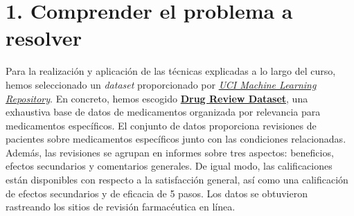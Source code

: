 \documentclass[spanish,]{article}
\begin{document}

\vspace{0.15cm}


\vspace{0.15cm}


\vspace{0.15cm}

\newpage

\thispagestyle{empty}
\tableofcontents
\newpage

\thispagestyle{empty}
\listoffigures
\newpage

\thispagestyle{empty}
\listoftables
\newpage

\pagestyle{fancy}
\fancyhf{}
\rhead{\thepage}
\setcounter{page}{1}

\hypertarget{comprender-el-problema-a-resolver}{%
\section{1. Comprender el problema a
resolver}\label{comprender-el-problema-a-resolver}}

Para la realización y aplicación de las técnicas explicadas a lo largo
del curso, hemos seleccionado un \emph{dataset} proporcionado por
\href{https://archive.ics.uci.edu/ml/index.php}{\emph{UCI Machine
Learning Repository}}. En concreto, hemos escogido
\href{https://archive.ics.uci.edu/ml/datasets/Drug+Review+Dataset+\%28Druglib.com\%29}{\textbf{Drug
Review Dataset}}, una exhaustiva base de datos de medicamentos
organizada por relevancia para medicamentos específicos. El conjunto de
datos proporciona revisiones de pacientes sobre medicamentos específicos
junto con las condiciones relacionadas. Además, las revisiones se
agrupan en informes sobre tres aspectos: beneficios, efectos secundarios
y comentarios generales. De igual modo, las calificaciones están
disponibles con respecto a la satisfacción general, así como una
calificación de efectos secundarios y de eficacia de 5 pasos. Los datos
se obtuvieron rastreando los sitios de revisión farmacéutica en línea.
\end{document}
